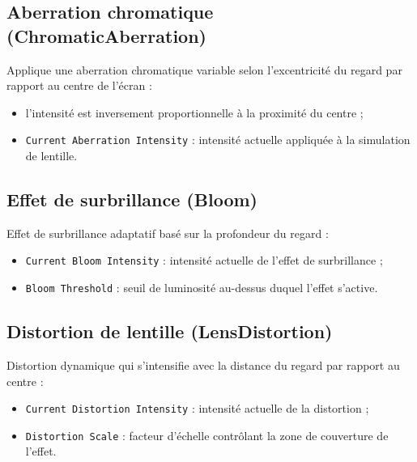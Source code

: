 \documentclass[12pt]{report}
\begin{document}
\subsection{Aberration chromatique (ChromaticAberration)}
Applique une aberration chromatique variable selon l'excentricité du regard par rapport au centre de l'écran :
\begin{itemize}
    \vspace{2mm}
    \item l'intensité est inversement proportionnelle à la proximité du centre ;
    \vspace{2mm}
    \item \texttt{Current Aberration Intensity} : intensité actuelle appliquée à la simulation de lentille.
    \vspace{2mm}
\end{itemize}

\subsection{Effet de surbrillance (Bloom)}
Effet de surbrillance adaptatif basé sur la profondeur du regard :
\begin{itemize}
    \vspace{2mm}
    \item \texttt{Current Bloom Intensity} : intensité actuelle de l'effet de surbrillance ;
    \vspace{2mm}
    \item \texttt{Bloom Threshold} : seuil de luminosité au-dessus duquel l'effet s'active.
    \vspace{2mm}
\end{itemize}

\subsection{Distortion de lentille (LensDistortion)}
Distortion dynamique qui s'intensifie avec la distance du regard par rapport au centre :
\begin{itemize}
    \vspace{2mm}
    \item \texttt{Current Distortion Intensity} : intensité actuelle de la distortion ;
    \vspace{2mm}
    \item \texttt{Distortion Scale} : facteur d'échelle contrôlant la zone de couverture de l'effet.
    \vspace{2mm}
\end{itemize}
\end{document}
